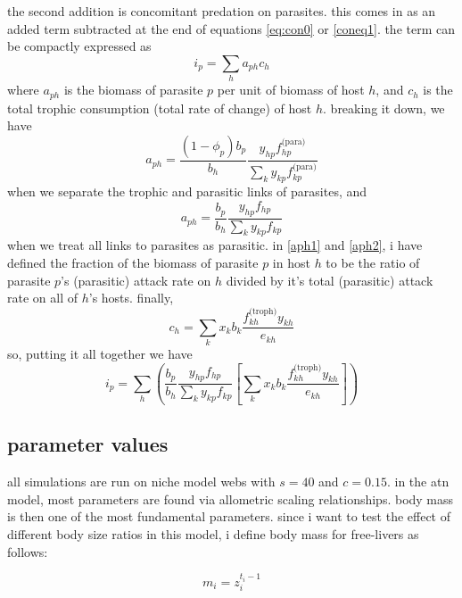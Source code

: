 \documentclass[11pt]{amsart}
\begin{document}
the second addition is concomitant predation on parasites.  this comes in as an added term subtracted at the end of equations \eqref{eq:con0} or \eqref{coneq1}.  the term can be compactly expressed as 
\begin{equation}
i_p = \sum_ha_{ph}c_h \label{ip1}
\end{equation}
where $a_{ph}$ is the biomass of parasite $p$ per unit of biomass of host $h$, and $c_h$ is the total trophic consumption (total rate of change) of host $h$.  breaking it down, we have
\begin{equation}
a_{ph} = \frac{(1-\phi_p)b_p}{b_h}\frac{y_{hp}f^\text{(para)}_{hp}}{\sum_{k}y_{kp}f^\text{(para)}_{kp}} \label{aph1}
\end{equation}
when we separate the trophic and parasitic links of parasites, and
\begin{equation}
a_{ph} = \frac{b_p}{b_h}\frac{y_{hp}f_{hp}}{\sum_{k}y_{kp}f_{kp}} \label{aph2}
\end{equation}
when we treat all links to parasites as parasitic.  in \eqref{aph1} and \eqref{aph2}, i have defined the fraction of the biomass of parasite $p$ in host $h$ to be the ratio of parasite $p$'s (parasitic) attack rate on $h$ divided by it's total (parasitic) attack rate on all of $h$'s hosts.  finally,
\begin{equation}
c_h = \sum_kx_kb_k\frac{f^\text{(troph)}_{kh}y_{kh}}{e_{kh}} \label{cpheq}
\end{equation}
so, putting it all together we have
\begin{equation}
i_p = \sum_h \left(\frac{b_p}{b_h}\frac{y_{hp}f_{hp}}{\sum_{k}y_{kp}f_{kp}}\left[\sum_kx_kb_k\frac{f^\text{(troph)}_{kh}y_{kh}}{e_{kh}}\right] \right) \label{ip2}
\end{equation}

\subsection{parameter values}
all simulations are run on niche model webs with $s = 40$ and $c = 0.15$.  in the atn model, most parameters are found via allometric scaling relationships.  body mass is then one of the most fundamental parameters.  since i want to test the effect of different body size ratios in this model, i define body mass for free-livers as follows:

\begin{equation}
m_i = z_i^{t_i-1} \label{mf}
\end{equation}
\end{document}
